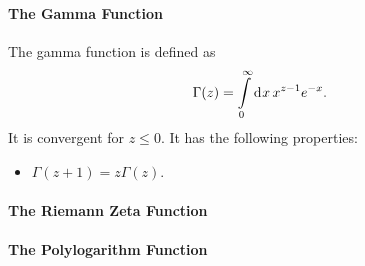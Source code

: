 \paragraph{The Gamma Function}
The gamma function is defined as
\begin{align*}
	\Gamma(z) = \int\limits_{0}^{\infty}\dd[]{x}x^{z - 1}e^{-x}.
\end{align*}
It is convergent for $z \leq 0$. It has the following properties:
\begin{itemize}
	\item $\Gamma(z + 1) = z\Gamma(z)$.
\end{itemize}

\paragraph{The Riemann Zeta Function}

\paragraph{The Polylogarithm Function}